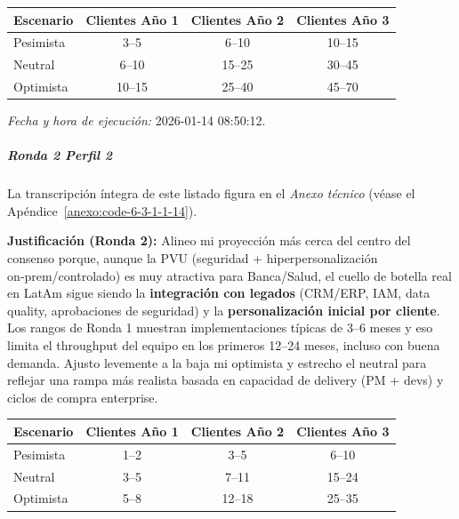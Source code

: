 \begin{center}
\footnotesize
\begin{tabular}{|l|c|c|c|}
\hline
\textbf{Escenario} & \textbf{Clientes Año 1} & \textbf{Clientes Año 2} & \textbf{Clientes Año 3} \\
\hline
Pesimista & 3--5 & 6--10 & 10--15 \\
\hline
Neutral & 6--10 & 15--25 & 30--45 \\
\hline
Optimista & 10--15 & 25--40 & 45--70 \\
\hline
\end{tabular}
\end{center}

\textit{Fecha y hora de ejecución:} 2026-01-14 08:50:12.

\subparagraph{Ronda 2 Perfil 2}

La transcripción íntegra de este listado figura en el \textit{Anexo técnico} (véase el Apéndice~\ref{anexo:code-6-3-1-1-14}).

\textbf{Justificación (Ronda 2):} Alineo mi proyección más cerca del centro del consenso porque, aunque la PVU (seguridad + hiperpersonalización on‑prem/controlado) es muy atractiva para Banca/Salud, el cuello de botella real en LatAm sigue siendo la \textbf{integración con legados} (CRM/ERP, IAM, data quality, aprobaciones de seguridad) y la \textbf{personalización inicial por cliente}. Los rangos de Ronda 1 muestran implementaciones típicas de 3–6 meses y eso limita el throughput del equipo en los primeros 12–24 meses, incluso con buena demanda. Ajusto levemente a la baja mi optimista y estrecho el neutral para reflejar una rampa más realista basada en capacidad de delivery (PM + devs) y ciclos de compra enterprise.

\begin{center}
\footnotesize
\begin{tabular}{|l|c|c|c|}
\hline
\textbf{Escenario} & \textbf{Clientes Año 1} & \textbf{Clientes Año 2} & \textbf{Clientes Año 3} \\
\hline
Pesimista & 1--2 & 3--5 & 6--10 \\
\hline
Neutral & 3--5 & 7--11 & 15--24 \\
\hline
Optimista & 5--8 & 12--18 & 25--35 \\
\hline
\end{tabular}
\end{center}

